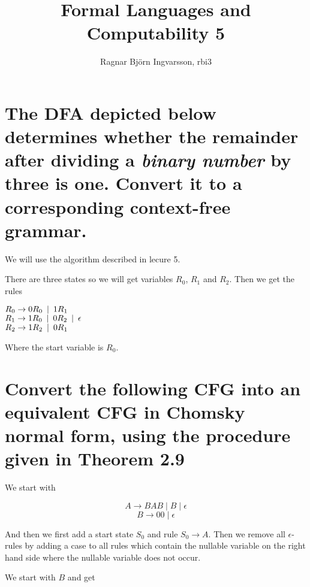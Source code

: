 \documentclass{article}
\title{Formal Languages and Computability 5}
\author{Ragnar Björn Ingvarsson, rbi3}
\begin{document}
\renewcommand\thepage{}
	
	\maketitle

	\newpage
	\setcounter{page}{1}
	\renewcommand\thepage{\arabic{page}}

	\section{The DFA depicted below determines whether the remainder after 
		dividing a \textit{binary number} by three is one. Convert it to 
		a corresponding context-free grammar.}

		We will use the algorithm described in lecure 5.

		There are three states so we will get variables $R_0$, $R_1$ and 
		$R_2$. Then we get the rules

		$R_0 \rightarrow 0R_0 \hspace{.5em} | \hspace{.5em} 1R_1$ \\
		$R_1 \rightarrow 1R_0 \hspace{.5em} | \hspace{.5em} 0R_2 \hspace{.5em} | \hspace{.5em} \epsilon$ \\
		$R_2 \rightarrow 1R_2 \hspace{.5em} | \hspace{.5em} 0R_1$

		Where the start variable is $R_0$.

	\section{Convert the following CFG into an equivalent CFG in Chomsky 
		normal form, using the procedure given in Theorem 2.9}

		We start with

		\[A\rightarrow BAB\mid B\mid\epsilon\]
		\[B\rightarrow 00\mid\epsilon\]

		And then we first add a start state $S_0$ and rule $S_0\rightarrow 
		A$. Then we remove all $\epsilon$-rules by adding a case to all 
		rules which contain the nullable variable on the right hand side 
		where the nullable variable does not occur.

		We start with $B$ and get
\end{document}
